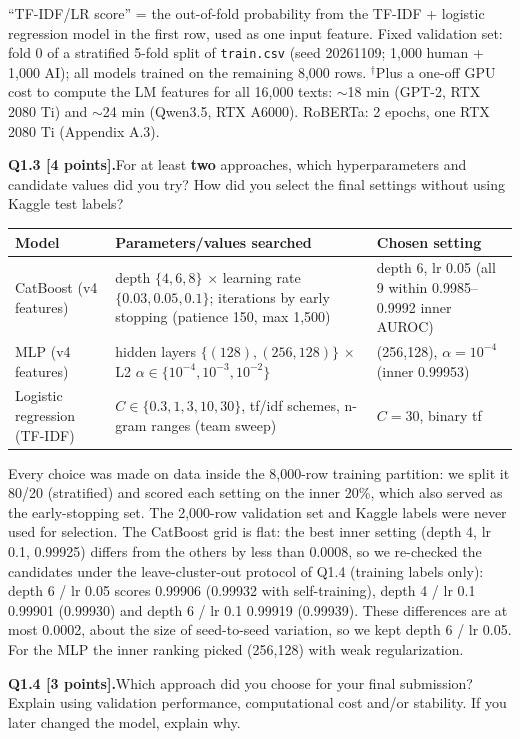\documentclass[11pt,letterpaper]{article}
\newcommand{\question}[2]{\needspace{4\baselineskip}\par\addvspace{0.45em}\noindent\textbf{#1}\quad #2\par\nobreak\vspace{0.1em}}
\newcommand{\smallnote}[1]{{\small\color{muted}#1}}
\begin{document}
\smallnote{``TF-IDF/LR score'' = the out-of-fold probability from the TF-IDF + logistic regression model in the first row, used as one input feature. Fixed validation set: fold 0 of a stratified 5-fold split of \texttt{train.csv} (seed 20261109; 1,000 human + 1,000 AI); all models trained on the remaining 8,000 rows. $^\dagger$Plus a one-off GPU cost to compute the LM features for all 16,000 texts: $\sim$18 min (GPT-2, RTX 2080 Ti) and $\sim$24 min (Qwen3.5, RTX A6000). RoBERTa: 2 epochs, one RTX 2080 Ti (Appendix A.3).}
\question{Q1.3 [4 points].}{For at least \textbf{two} approaches, which hyperparameters and candidate values did you try? How did you select the final settings without using Kaggle test labels?}
\begin{tabularx}{\linewidth}{@{}p{1.18in}Yp{1.38in}@{}}\toprule Model & Parameters/values searched & Chosen setting \\ \midrule
CatBoost (v4 features) & depth $\{4,6,8\}$ $\times$ learning rate $\{0.03, 0.05, 0.1\}$; iterations by early stopping (patience 150, max 1,500) & depth 6, lr 0.05 (all 9 within 0.9985--0.9992 inner AUROC) \\
MLP (v4 features) & hidden layers $\{(128), (256,128)\}$ $\times$ L2 $\alpha \in \{10^{-4}, 10^{-3}, 10^{-2}\}$ & (256,128), $\alpha=10^{-4}$ (inner 0.99953) \\
Logistic regression (TF-IDF) & $C \in \{0.3, 1, 3, 10, 30\}$, tf/idf schemes, n-gram ranges (team sweep) & $C=30$, binary tf \\
\bottomrule\end{tabularx}
Every choice was made on data inside the 8,000-row training partition: we split it 80/20 (stratified) and scored each setting on the inner 20\%, which also served as the early-stopping set. The 2,000-row validation set and Kaggle labels were never used for selection. The CatBoost grid is flat: the best inner setting (depth 4, lr 0.1, 0.99925) differs from the others by less than 0.0008, so we re-checked the candidates under the leave-cluster-out protocol of Q1.4 (training labels only): depth 6 / lr 0.05 scores 0.99906 (0.99932 with self-training), depth 4 / lr 0.1 0.99901 (0.99930) and depth 6 / lr 0.1 0.99919 (0.99939). These differences are at most 0.0002, about the size of seed-to-seed variation, so we kept depth 6 / lr 0.05. For the MLP the inner ranking picked (256,128) with weak regularization.
\question{Q1.4 [3 points].}{Which approach did you choose for your final submission? Explain using validation performance, computational cost and/or stability. If you later changed the model, explain why.}
\end{document}
